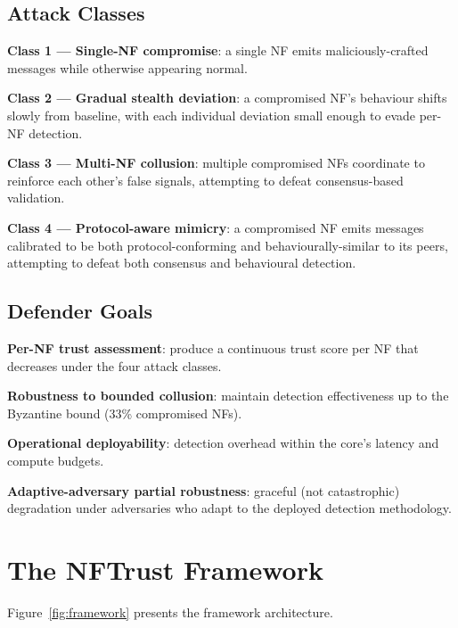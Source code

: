 \documentclass[sigconf,nonacm]{acmart}
\begin{document}
\subsection{Attack Classes}

\textbf{Class 1 --- Single-NF compromise}: a single NF emits
maliciously-crafted messages while otherwise appearing normal.

\textbf{Class 2 --- Gradual stealth deviation}: a compromised NF's
behaviour shifts slowly from baseline, with each individual
deviation small enough to evade per-NF detection.

\textbf{Class 3 --- Multi-NF collusion}: multiple compromised NFs
coordinate to reinforce each other's false signals, attempting to
defeat consensus-based validation.

\textbf{Class 4 --- Protocol-aware mimicry}: a compromised NF
emits messages calibrated to be both protocol-conforming and
behaviourally-similar to its peers, attempting to defeat both
consensus and behavioural detection.

\subsection{Defender Goals}

\textbf{Per-NF trust assessment}: produce a continuous trust score
per NF that decreases under the four attack classes.

\textbf{Robustness to bounded collusion}: maintain detection
effectiveness up to the Byzantine bound (33\% compromised NFs).

\textbf{Operational deployability}: detection overhead within the
core's latency and compute budgets.

\textbf{Adaptive-adversary partial robustness}: graceful (not
catastrophic) degradation under adversaries who adapt to the
deployed detection methodology.

\section{The NFTrust Framework}

Figure~\ref{fig:framework} presents the framework architecture.
\end{document}

